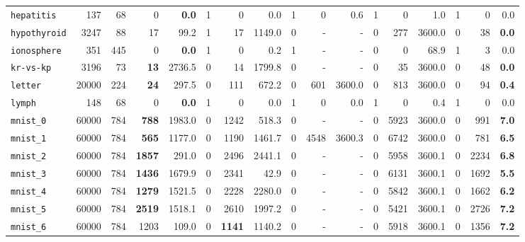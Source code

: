 \begin{tabular}{lccrrrrrrrrrrrrrr}
\texttt{hepatitis} & \multicolumn{1}{r}{137} & \multicolumn{1}{r}{68}  & 0 & \textbf{0.0} & 1 & 0 & 0.0 & 1 & 0 & 0.6 & 1 & 0 & 1.0 & 1 & 0 & 0.0\\
\texttt{hypothyroid} & \multicolumn{1}{r}{3247} & \multicolumn{1}{r}{88}  & 17 & 99.2 & 1 & 17 & 1149.0 & 0 & - & - & 0 & 277 & 3600.0 & 0 & 38 & \textbf{0.0}\\
\texttt{ionosphere} & \multicolumn{1}{r}{351} & \multicolumn{1}{r}{445}  & 0 & \textbf{0.0} & 1 & 0 & 0.2 & 1 & - & - & 0 & 0 & 68.9 & 1 & 3 & 0.0\\
\texttt{kr-vs-kp} & \multicolumn{1}{r}{3196} & \multicolumn{1}{r}{73}  & \textbf{13} & 2736.5 & 0 & 14 & 1799.8 & 0 & - & - & 0 & 35 & 3600.0 & 0 & 48 & \textbf{0.0}\\
\texttt{letter} & \multicolumn{1}{r}{20000} & \multicolumn{1}{r}{224}  & \textbf{24} & 297.5 & 0 & 111 & 672.2 & 0 & 601 & 3600.0 & 0 & 813 & 3600.0 & 0 & 94 & \textbf{0.4}\\
\texttt{lymph} & \multicolumn{1}{r}{148} & \multicolumn{1}{r}{68}  & 0 & \textbf{0.0} & 1 & 0 & 0.0 & 1 & 0 & 0.0 & 1 & 0 & 0.4 & 1 & 0 & 0.0\\
\texttt{mnist\_0} & \multicolumn{1}{r}{60000} & \multicolumn{1}{r}{784}  & \textbf{788} & 1983.0 & 0 & 1242 & 518.3 & 0 & - & - & 0 & 5923 & 3600.0 & 0 & 991 & \textbf{7.0}\\
\texttt{mnist\_1} & \multicolumn{1}{r}{60000} & \multicolumn{1}{r}{784}  & \textbf{565} & 1177.0 & 0 & 1190 & 1461.7 & 0 & 4548 & 3600.3 & 0 & 6742 & 3600.0 & 0 & 781 & \textbf{6.5}\\
\texttt{mnist\_2} & \multicolumn{1}{r}{60000} & \multicolumn{1}{r}{784}  & \textbf{1857} & 291.0 & 0 & 2496 & 2441.1 & 0 & - & - & 0 & 5958 & 3600.1 & 0 & 2234 & \textbf{6.8}\\
\texttt{mnist\_3} & \multicolumn{1}{r}{60000} & \multicolumn{1}{r}{784}  & \textbf{1436} & 1679.9 & 0 & 2341 & 42.9 & 0 & - & - & 0 & 6131 & 3600.1 & 0 & 1692 & \textbf{5.5}\\
\texttt{mnist\_4} & \multicolumn{1}{r}{60000} & \multicolumn{1}{r}{784}  & \textbf{1279} & 1521.5 & 0 & 2228 & 2280.0 & 0 & - & - & 0 & 5842 & 3600.1 & 0 & 1662 & \textbf{6.2}\\
\texttt{mnist\_5} & \multicolumn{1}{r}{60000} & \multicolumn{1}{r}{784}  & \textbf{2519} & 1518.1 & 0 & 2610 & 1997.2 & 0 & - & - & 0 & 5421 & 3600.1 & 0 & 2726 & \textbf{7.2}\\
\texttt{mnist\_6} & \multicolumn{1}{r}{60000} & \multicolumn{1}{r}{784}  & 1203 & 109.0 & 0 & \textbf{1141} & 1140.2 & 0 & - & - & 0 & 5918 & 3600.1 & 0 & 1356 & \textbf{7.2}\\

\end{tabular}
